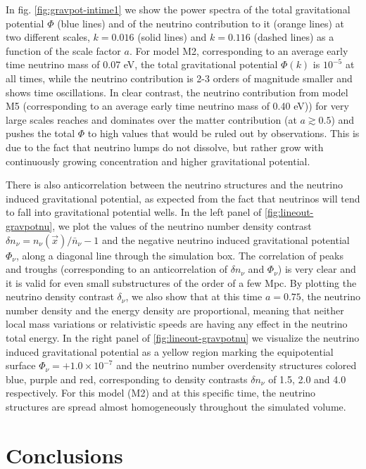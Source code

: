 In fig. \ref{fig:gravpot-intime1} we show the power spectra of the
total gravitational potential $\Phi$ (blue lines) and of the neutrino
contribution to it (orange lines) at two different scales, $k=0.016$
(solid lines) and $k=0.116$ (dashed lines) as a function of the scale
factor $a$. For model M2, corresponding to an average early time
neutrino mass of 0.07 eV, the total gravitational potential $\Phi(k)$
is $10^{-5}$ at all times, while the neutrino contribution is 2-3
orders of magnitude smaller and shows time oscillations. In clear
contrast, the neutrino contribution from model M5 (corresponding to
an average early time neutrino mass of 0.40 eV)) for very large scales
reaches and dominates over the matter contribution (at $a\gtrsim0.5$)
and pushes the total $\Phi$ to high values that would be ruled out
by observations. This is due to the fact that neutrino lumps do not
dissolve, but rather grow with continuously growing concentration
and higher gravitational potential.

There is also anticorrelation between the neutrino structures and
the neutrino induced gravitational potential, as expected from the
fact that neutrinos will tend to fall into gravitational potential
wells. In the left panel of \cref{fig:lineout-gravpotnu}, we plot
the values of the neutrino number density contrast $\delta n_{\nu}=n_{\nu}(\vec{x})/\bar{n}_{\nu}-1$
and the negative neutrino induced gravitational potential $\Phi_{\nu}$,
along a diagonal line through the simulation box. The correlation
of peaks and troughs (corresponding to an anticorrelation of $\delta n_{\nu}$
and $\Phi_{\nu}$) is very clear and it is valid for even small substructures
of the order of a few Mpc. By plotting the neutrino density contrast
$\delta_{\nu}$, we also show that at this time $a=0.75$, the neutrino
number density and the energy density are proportional, meaning that
neither local mass variations or relativistic speeds are having any
effect in the neutrino total energy. In the right panel of \cref{fig:lineout-gravpotnu}
we visualize the neutrino induced gravitational potential as a yellow
region marking the equipotential surface $\Phi_{\nu}=+1.0\times10^{-7}$
and the neutrino number overdensity structures colored blue, purple
and red, corresponding to density contrasts $\delta n_{\nu}$ of 1.5,
2.0 and 4.0 respectively. For this model (M2) and at this specific
time, the neutrino structures are spread almost homogeneously throughout
the simulated volume.




\section{Conclusions \label{sec:GNQ-conclu}}

